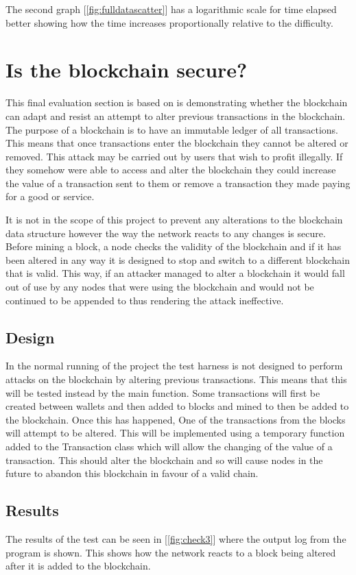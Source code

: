 \documentclass{l4proj}
\begin{document}
The second graph [\ref{fig:fulldatascatter}] has a logarithmic scale for time elapsed better showing how the 
time increases proportionally relative to the difficulty.


\section{Is the blockchain secure?}
This final evaluation section is based on is demonstrating whether the blockchain can adapt and resist an attempt to 
alter previous transactions in the blockchain. The purpose of a blockchain is to have an immutable ledger of all transactions.
This means that once transactions enter the blockchain they cannot be altered or removed. This attack may be carried out
by users that wish to profit illegally. If they somehow were able to access and alter the blockchain they could increase
the value of a transaction sent to them or remove a transaction they made paying for a good or service.

It is not in the scope of this project to prevent any alterations to the blockchain data structure however the way the
network reacts to any changes is secure. Before mining a block, a node checks the validity of the blockchain and if it
has been altered in any way it is designed to stop and switch to a different blockchain that is valid. This way, if an
attacker managed to alter a blockchain it would fall out of use by any nodes that were using the blockchain and would
not be continued to be appended to thus rendering the attack ineffective.
\subsection{Design}
In the normal running of the project the test harness is not designed to perform attacks on the blockchain by altering
previous transactions. This means that this will be tested instead by the main function. Some transactions will first
be created between wallets and then added to blocks and mined to then be added to the blockchain. Once this has happened,
One of the transactions from the blocks will attempt to be altered. This will be implemented using a temporary function
added to the Transaction class which will allow the changing of the value of a transaction. This should alter the 
blockchain and so will cause nodes in the future to abandon this blockchain in favour of a valid chain.

\subsection{Results}
The results of the test can be seen in [\ref{fig:check3}] where the output log from the program is shown. This shows
how the network reacts to a block being altered after it is added to the blockchain.
\end{document}
